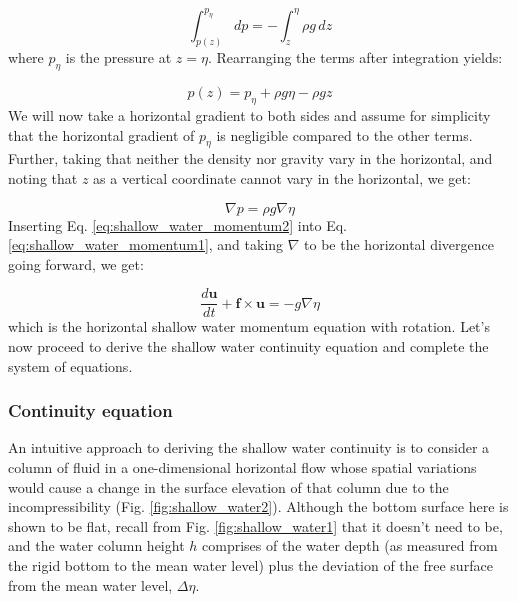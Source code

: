 \documentclass[12pt]{article}
\numberwithin{equation}{section}
\numberwithin{figure}{section}
\numberwithin{table}{section}
\begin{document}
\begin{equation}
  \int_{p(z)}^{p_\eta} dp = - \int_z^\eta \rho g \, dz
\end{equation}
where $p_\eta$ is the pressure at $z = \eta$.
Rearranging the terms after integration yields:

\begin{equation}
  p(z) = p_\eta + \rho g \eta - \rho g z
\end{equation}
We will now take a horizontal gradient to both sides and assume for simplicity
that the horizontal gradient of $p_\eta$ is negligible compared to the other
terms.
Further, taking that neither the density nor gravity vary in the horizontal,
and noting that $z$ as a vertical coordinate cannot vary in the horizontal,
we get:

\begin{equation}
  \nabla p = \rho g \nabla \eta
  \label{eq:shallow_water_momentum2}
\end{equation}
Inserting Eq. \ref{eq:shallow_water_momentum2} into
Eq. \ref{eq:shallow_water_momentum1}, and taking $\nabla$ to be the horizontal
divergence going forward, we get:

\begin{equation}
  \frac{d \mathbf{u}}{dt} + \mathbf{f} \times \mathbf{u} =
  - g \nabla \eta
  \label{eq:shallow_water_momentum3}
\end{equation}
which is the horizontal shallow water momentum equation with rotation.
Let's now proceed to derive the shallow water continuity equation and complete
the system of equations.

\subsubsection{Continuity equation}

An intuitive approach to deriving the shallow water continuity is to consider
a column of fluid in a one-dimensional horizontal flow whose spatial variations
would cause a change in the surface elevation of that column due to the
incompressibility (Fig. \ref{fig:shallow_water2}).
Although the bottom surface here is shown to be flat, recall from Fig.
\ref{fig:shallow_water1} that it doesn't need to be, and the water column height
$h$ comprises of the water depth (as measured from the rigid bottom to the mean
water level) plus the deviation of the free surface from the mean water level,
$\Delta \eta$.
\end{document}
